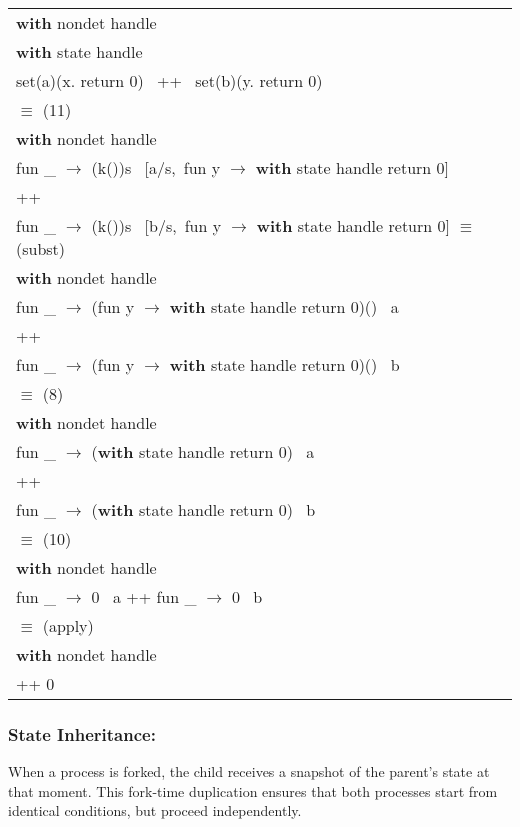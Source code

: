\documentclass[logo,bsc,singlespacing,parskip]{infthesis}
\begin{document}
\begin{longtable}{@{}l@{}}
\textbf{with } nondet handle \\
\quad \textbf{with } state handle \\
\quad\quad set(a)(x. return 0) \, ++ \, set(b)(y. return 0) \\

\quad$\equiv$ (11) \\

\textbf{with } nondet handle \\
\quad fun \_ $\rightarrow$ (k())s \ [a/s,\ fun y $\rightarrow$ \textbf{with } state handle return 0]\\
\quad\quad ++ \\
\quad fun \_ $\rightarrow$ (k())s \ [b/s,\ fun y $\rightarrow$ \textbf{with } state handle return 0] 
\quad$\equiv$ (subst) \\
\textbf{with } nondet handle \\
\quad fun \_ $\rightarrow$ (fun y $\rightarrow$ \textbf{with } state handle return 0)() \ a \\
\quad\quad ++ \\
\quad fun \_ $\rightarrow$ (fun y $\rightarrow$ \textbf{with } state handle return 0)() \ b \\
\quad$\equiv$ (8) \\
\textbf{with } nondet handle \\
\quad fun \_ $\rightarrow$ (\textbf{with } state handle return 0) \ a \\
\quad ++ \\
\quad fun \_ $\rightarrow$ (\textbf{with } state handle return 0) \ b \\
\quad$\equiv$ (10) \\
\textbf{with } nondet handle \\
\quad fun \_ $\rightarrow$ 0 \ a \quad ++ \quad fun \_ $\rightarrow$ 0 \ b \\
\quad$\equiv$ (apply) \\
\textbf{with } nondet handle \\
\quad 0 ++ 0 \\
\end{longtable}


\subsubsection{State Inheritance:} When a process is forked, the child receives a snapshot of the parent’s state at that moment. This fork-time duplication ensures that both processes start from identical conditions, but proceed independently.
\end{document}
